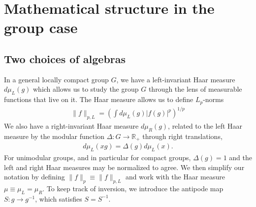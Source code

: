 \documentclass[11pt]{article}
\newcommand{\lb}{\left(}
\newcommand{\rb}{\right)}
\begin{document}
\section{Mathematical structure in the group case}
\label{sec:group-case-appendix}

\subsection{Two choices of algebras}

In a general locally compact group $G$, we have a left-invariant Haar measure $d\mu_L(g)$ which allows us to study the group $G$ through the lens of measurable functions that live on it. The Haar measure allows us to define $L_p$-norms
\begin{align}
    \|f\|_{p,L}=\lb\int d\mu_L(g) |f(g)|^p\rb^{1/p}
\end{align}
We also have a right-invariant Haar measure $d\mu_R(g)$, related to the left Haar measure by the modular function $\Delta:G\to\mathbb R_+$ through right translations,
\begin{align}
    d\mu_L(xg)=\Delta(g)d\mu_L(x).
\end{align}
For unimodular groups, and in particular for compact groups, $\Delta(g)=1$ and the left and right Haar measures may be normalized to agree. We then simplify our notation by defining $\|f\|_p\equiv \|f\|_{p,L}$ and work with the Haar measure $\mu\equiv \mu_L=\mu_R$. To keep track of inversion, we introduce the antipode map $S:g\to g^{-1}$, which satisfies $S=S^{-1}$.
\end{document}
